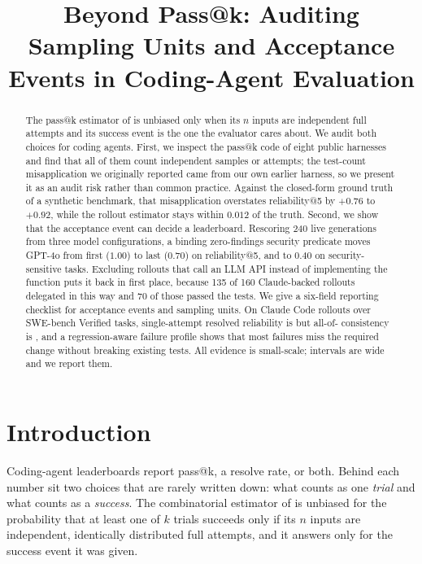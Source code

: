 \documentclass[11pt,a4paper]{article}
\title[Beyond Pass@k: Sampling Units and Acceptance Events]{Beyond Pass@k: Auditing Sampling Units and Acceptance Events in Coding-Agent Evaluation}
\begin{document}
\maketitle

\begin{abstract}
The pass@k estimator of \citet{chen2021codex} is unbiased only when its $n$ inputs are independent full attempts and its success event is the one the evaluator cares about. We audit both choices for coding agents. First, we inspect the pass@k code of eight public harnesses and find that all of them count independent samples or attempts; the test-count misapplication we originally reported came from our own earlier harness, so we present it as an audit risk rather than common practice. Against the closed-form ground truth of a synthetic benchmark, that misapplication overstates reliability@5 by $+0.76$ to $+0.92$, while the rollout estimator stays within $0.012$ of the truth. Second, we show that the acceptance event can decide a leaderboard. Rescoring 240 live generations from three model configurations, a binding zero-findings security predicate moves GPT-4o from first ($1.00$) to last ($0.70$) on reliability@5, and to $0.40$ on security-sensitive tasks. Excluding rollouts that call an LLM API instead of implementing the function puts it back in first place, because 135 of 160 Claude-backed rollouts delegated in this way and 70 of those passed the tests. We give a six-field reporting checklist for acceptance events and sampling units. On \sweSonnetRollouts{} Claude Code rollouts over \sweNTasks{} SWE-bench Verified tasks, single-attempt resolved reliability is \sweSonnetResolvedRelone{} but all-of-\sweAttempts{} consistency is \sweSonnetResolvedPassk{}, and a regression-aware failure profile shows that most failures miss the required change without breaking existing tests. All evidence is small-scale; intervals are wide and we report them.
\end{abstract}

\section{Introduction}
\label{sec:intro}

Coding-agent leaderboards report pass@k, a resolve rate, or both. Behind each number sit two choices that are rarely written down: what counts as one \emph{trial} and what counts as a \emph{success}. The combinatorial estimator of \citet{chen2021codex} is unbiased for the probability that at least one of $k$ trials succeeds only if its $n$ inputs are independent, identically distributed full attempts, and it answers only for the success event it was given.
\end{document}
